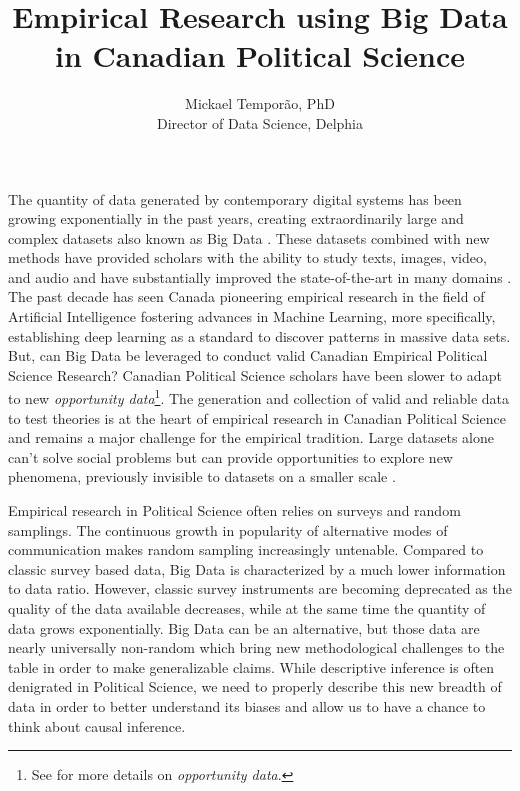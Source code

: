 \documentclass{article}
\author{Mickael Temporão, PhD \\ Director of Data Science, Delphia}
\title{Empirical Research using Big Data in Canadian Political Science}
\begin{document}
\maketitle

The quantity of data generated by contemporary digital systems has been growing exponentially in the past years, creating extraordinarily large and complex datasets also known as Big Data \citep{groves2011three, keller2017evolution, lazer2017data}.
These datasets combined with new methods have provided scholars with the ability to study texts, images, video, and audio and have substantially improved the state-of-the-art in many domains \citep{lecun2015deep}.
The past decade has seen Canada pioneering empirical research in the field of Artificial Intelligence fostering advances in Machine Learning, more specifically, establishing deep learning as a standard to discover patterns in massive data sets.
But, can Big Data be leveraged to conduct valid Canadian Empirical Political Science Research?
Canadian Political Science scholars have been slower to adapt to new \textit{opportunity data}\footnote{See \citet{keller2017evolution} for more details on \textit{opportunity data}.}.
The generation and collection of valid and reliable data to test theories is at the heart of empirical research in Canadian Political Science and remains a major challenge for the empirical tradition.
Large datasets alone can't solve social problems but can provide opportunities to explore new phenomena, previously invisible to datasets on a smaller scale \citep{grimmer2015we}.

Empirical research in Political Science often relies on surveys and random samplings.
The continuous growth in popularity of alternative modes of communication makes random sampling increasingly untenable.
Compared to classic survey based data, Big Data is characterized by a much lower information to data ratio.
However, classic survey instruments are becoming deprecated as the quality of the data available decreases, while at the same time the quantity of data grows exponentially.
Big Data can be an alternative, but those data are nearly universally non-random which bring new methodological challenges to the table in order to make generalizable claims.
While descriptive inference is often denigrated in Political Science, we need to properly describe this new breadth of data in order to better understand its biases and allow us to have a chance to think about causal inference.
\end{document}
